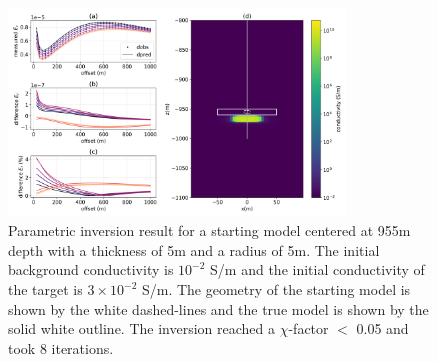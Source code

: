 \begin{figure}
    \begin{center}
    \includegraphics[width=0.8\textwidth]{figures/inversion/parametric_voxel2.png}
    \end{center}
\caption{
    Parametric inversion result for a starting model
    centered at 955m depth with a thickness of 5m and a radius of 5m. The initial background
    conductivity is $10^{-2}$ S/m and the initial conductivity of the target is $3\times10^{-2}$ S/m.
    The geometry of the starting model is shown by the white dashed-lines and the
    true model is shown by the solid white outline. The inversion reached a $\chi$-factor $<$ 0.05
    and took 8 iterations.
}
\label{fig:parametric_voxel2}
\end{figure}
